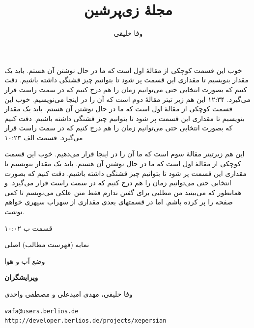 \documentclass[12pt,twoside]{xepersian-magazine}
\title{مجلهٔ زی‌پرشین}
\author{وفا خلیقی}
\begin{document}
\begin{frontpage}
{خوب این قسمت کوچکی از مقالهٔ اول است که ما در حال نوشتن آن هستم. باید یک مقدار بنویسیم تا مقداری این قسمت پر شود تا بتوانیم چیز قشنگی داشته باشیم. دقت کنیم که بصورت انتخابی حتی می‌توانیم زمان را هم درج کنیم که در سمت راست قرار می‌گیرد.}%
{۱۲:۳۴}
%
{این هم زیر تیتر مقالهٔ دوم است که آن را در اینجا می‌نویسیم.}%
{خوب این قسمت کوچکی از مقالهٔ اول است که ما در حال نوشتن آن هستم. باید یک مقدار بنویسیم تا مقداری این قسمت پر شود تا بتوانیم چیز قشنگی داشته باشیم. دقت کنیم که بصورت انتخابی حتی می‌توانیم زمان را هم درج کنیم که در سمت راست قرار می‌گیرد.}%
{قسمت الف}%
{۱۰:۲۳}

%
{این هم زیرتیتر مقالهٔ سوم است که ما آن را در اینجا قرار می‌دهیم.}%
{خوب این قسمت کوچکی از مقالهٔ اول است که ما در حال نوشتن آن هستم. باید یک مقدار بنویسیم تا مقداری این قسمت پر شود تا بتوانیم چیز قشنگی داشته باشیم. دقت کنیم که بصورت انتخابی حتی می‌توانیم زمان را هم درج کنیم که در سمت راست قرار می‌گیرد. و همانطور که می‌بینید من مطلبی برای گفتن ندارم فقط متن علکی می‌نویسم تا کمی صفحه را پر کرده باشم. اما در قسمتهای بعدی مقداری از سهراب سپهری خواهم نوشت.}%

{قسمت ب}%
{۱۰:۰۲}

\begin{indexblock}{نمایه (فهرست مطالب) اصلی}



\end{indexblock}

\begin{weatherblock}{وضع آب و هوا}
\end{weatherblock}

\begin{authorblock}
\textbf{ویرایشگران}

وفا خلیقی، مهدی امیدعلی و مصطفی واحدی

\texttt{vafa@users.berlios.de\\[5pt]
http://developer.berlios.de/projects/xepersian}\\
\end{authorblock}
\end{frontpage}
\end{document}
